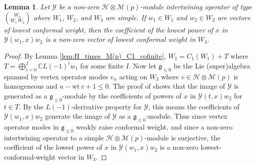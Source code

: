 \documentclass[11pt, reqno]{amsart}
\newtheorem{lem}[thm]{Lemma}
\theoremstyle{definition}\newtheorem{defi}[thm]{Definition}
\theoremstyle{definition}\newtheorem{rem}[thm]{Remark}
\theoremstyle{definition}\newtheorem{exam}[thm]{Example}
\theoremstyle{definition}\newtheorem{assum}[thm]{Assumption}
\newcommand{\cH}{\mathcal{H}}
\newcommand{\cY}{\mathcal{Y}}
\newcommand{\cM}{\mathcal{M}}
\newcommand{\CC}{\mathbb{C}}
\begin{document}
 
 \begin{lem}\label{lem:Mp_intw_op_low_wt_vectors}
 Let $\cY$ be a non-zero $\cH\otimes\cM(p)$-module intertwining operator of type $\binom{W_3}{W_1\,W_2}$ where $W_1$, $W_2$, and $W_3$ are simple. If $w_1\in W_1$ and $w_2\in W_2$ are vectors of lowest conformal weight, then the coefficient of the lowest power of $x$ in $\cY(w_1,x)w_2$ is a non-zero vector of lowest conformal weight in $W_3$.
 \end{lem}
 \begin{proof}
 By Lemma \ref{lem:H_times_M(p)_C1_cofinite}, $W_1=C_1(W_1)+T$ where $T=\bigoplus_{i=0}^I \CC L(-1)^i w_1$ for some finite $I$. Now let $\mathfrak{g}_{\leq 0}$ be the Lie (super)algebra spanned by vertex operator modes $v_n$ acting on $W_3$ where $v\in\cH\otimes\cM(p)$ is homogeneous and $n-\mathrm{wt}\,v+1\leq 0$. The proof of \cite[Lemma 2.11]{CMY-completions} shows that the image of $\cY$ is generated as a $\mathfrak{g}_{\leq 0}$-module by the coefficients of powers of $x$ in $\cY(t,x)w_2$ for $t\in T$. By the $L(-1)$-derivative property for $\cY$, this means the coefficients of $\cY(w_1,x)w_2$ generate the image of $\cY$ as a $\mathfrak{g}_{\leq 0}$-module. Thus since vertex operator modes in $\mathfrak{g}_{\leq 0}$ weakly raise conformal weight, and since a non-zero intertwining operator to a simple $\cH\otimes\cM(p)$-module is surjective, the coefficient of the lowest power of $x$ in $\cY(w_1,x)w_2$ is a non-zero lowest-conformal-weight vector in $W_3$.
 \end{proof}
 
\end{document}
